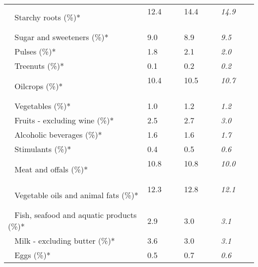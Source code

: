 \begin{tabular}{L{3.9cm} R{1cm} R{1cm} R{1cm}}
	 ~ Starchy roots (\%)* & 12.4 ~ \ \ & 14.4 ~ \ \ & \textit{14.9} ~ \ \ \\ 
	 ~ Sugar and sweeteners (\%)* & 9.0 ~ \ \ & 8.9 ~ \ \ & \textit{9.5} ~ \ \ \\ 
	 ~ Pulses (\%)* & 1.8 ~ \ \ & 2.1 ~ \ \ & \textit{2.0} ~ \ \ \\ 
	 ~ Treenuts (\%)* & 0.1 ~ \ \ & 0.2 ~ \ \ & \textit{0.2} ~ \ \ \\ 
	 ~ Oilcrops (\%)* & 10.4 ~ \ \ & 10.5 ~ \ \ & \textit{10.7} ~ \ \ \\ 
	 ~ Vegetables (\%)* & 1.0 ~ \ \ & 1.2 ~ \ \ & \textit{1.2} ~ \ \ \\ 
	 ~ Fruits - excluding wine (\%)* & 2.5 ~ \ \ & 2.7 ~ \ \ & \textit{3.0} ~ \ \ \\ 
	 ~ Alcoholic beverages (\%)* & 1.6 ~ \ \ & 1.6 ~ \ \ & \textit{1.7} ~ \ \ \\ 
	 ~ Stimulants (\%)* & 0.4 ~ \ \ & 0.5 ~ \ \ & \textit{0.6} ~ \ \ \\ 
	 ~ Meat and offals (\%)* & 10.8 ~ \ \ & 10.8 ~ \ \ & \textit{10.0} ~ \ \ \\ 
	 ~ Vegetable oils and animal fats (\%)* & 12.3 ~ \ \ & 12.8 ~ \ \ & \textit{12.1} ~ \ \ \\ 
	 ~ Fish, seafood and aquatic products (\%)* & 2.9 ~ \ \ & 3.0 ~ \ \ & \textit{3.1} ~ \ \ \\ 
	 ~ Milk - excluding butter (\%)* & 3.6 ~ \ \ & 3.0 ~ \ \ & \textit{3.1} ~ \ \ \\ 
	 ~ Eggs (\%)* & 0.5 ~ \ \ & 0.7 ~ \ \ & \textit{0.6} ~ \ \ \\ 
       \toprule
      \end{tabular}
      \clearpage
